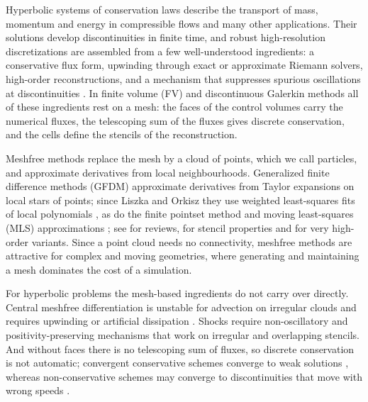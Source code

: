 \documentclass[11pt,a4paper]{article}
\numberwithin{equation}{section}
\begin{document}
Hyperbolic systems of conservation laws describe the transport of mass, momentum and energy in compressible flows and many other applications. Their solutions develop discontinuities in finite time, and robust high-resolution discretizations are assembled from a few well-understood ingredients: a conservative flux form, upwinding through exact or approximate Riemann solvers, high-order reconstructions, and a mechanism that suppresses spurious oscillations at discontinuities \cite{vanLeer1979,Harten1987,Shu1998,Toro2009}. In finite volume (FV) and discontinuous Galerkin methods all of these ingredients rest on a mesh: the faces of the control volumes carry the numerical fluxes, the telescoping sum of the fluxes gives discrete conservation, and the cells define the stencils of the reconstruction.

Meshfree methods replace the mesh by a cloud of points, which we call particles, and approximate derivatives from local neighbourhoods. Generalized finite difference methods (GFDM) \cite{Jensen1972,Perrone1975} approximate derivatives from Taylor expansions on local stars of points; since Liszka and Orkisz \cite{Liszka1980} they use weighted least-squares fits of local polynomials \cite{Benito2001,Benito2007}, as do the finite pointset method \cite{Tiwari2003} and moving least-squares (MLS) approximations \cite{Lancaster1981,Levin1998}; see \cite{Belytschko1996,Nguyen2008} for reviews, \cite{Seibold2006} for stencil properties and \cite{Clain2024} for very high-order variants. Since a point cloud needs no connectivity, meshfree methods are attractive for complex and moving geometries, where generating and maintaining a mesh dominates the cost of a simulation.

For hyperbolic problems the mesh-based ingredients do not carry over directly. Central meshfree differentiation is unstable for advection on irregular clouds and requires upwinding or artificial dissipation \cite{FornbergLehto2011,Willems2025}. Shocks require non-oscillatory and positivity-preserving mechanisms that work on irregular and overlapping stencils. And without faces there is no telescoping sum of fluxes, so discrete conservation is not automatic; convergent conservative schemes converge to weak solutions \cite{LaxWendroff1960}, whereas non-conservative schemes may converge to discontinuities that move with wrong speeds \cite{HouLeFloch1994}.
\end{document}

